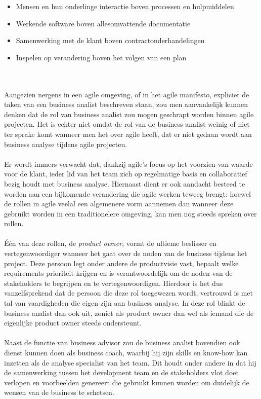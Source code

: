 \documentclass{hogent-article}
\begin{document}
\begin{itemize}
  \item Mensen en hun onderlinge interactie boven processen en hulpmiddelen
  \item Werkende software boven allesomvattende documentatie
  \item Samenwerking met de klant boven contractonderhandelingen
  \item Inspelen op verandering boven het volgen van een plan
\end{itemize}
\autocite{fowler2001agile}
\\~~\\
Aangezien nergens in een agile omgeving, of in het agile manifesto, expliciet de taken van een business analist beschreven staan, zou men aanvankelijk kunnen denken dat de rol van business analist zou mogen geschrapt worden binnen agile projecten. Het is echter niet omdat de rol van de business analist weinig of niet ter sprake komt wanneer men het over agile heeft, dat er niet gedaan wordt aan business analyse tijdens agile projecten. 
\\~~\\
Er wordt immers verwacht dat, dankzij agile's focus op het voorzien van waarde voor de klant, ieder lid van het team zich op regelmatige basis en collaboratief bezig houdt met business analyse. Hiernaast dient er ook aandacht besteed te worden aan een bijkomende verandering die agile werken teweeg brengt: hoewel de rollen in agile veelal een algemenere vorm aannemen dan wanneer deze gebruikt worden in een traditionelere omgeving, kan men nog steeds spreken over rollen. 
\\~~\\
Één van deze rollen, de \emph{product owner}, vormt de ultieme beslisser en vertegenwoordiger wanneer het gaat over de noden van de business tijdens het project. Deze persoon legt onder andere de productvisie vast, bepaalt welke requirements prioriteit krijgen en is verantwoordelijk om de noden van de stakeholders te begrijpen en te vertegenwoordigen. Hierdoor is het dus vanzelfsprekend dat de persoon die deze rol toegewezen wordt, vertrouwd is met tal van vaardigheden die eigen zijn aan business analyse. In deze rol blinkt de business analist dan ook uit, zoniet als product owner dan wel als iemand die de eigenlijke product owner steeds ondersteunt. 
\\~~\\
Naast de functie van business advisor zou de business analist bovendien ook dienst kunnen doen als business coach, waarbij hij zijn skills en know-how kan inzetten als de analyse specialist van het team. Dit houdt onder andere in dat hij de samenwerking tussen het development team en de stakeholders vlot doet verlopen en voorbeelden genereert die gebruikt kunnen worden om duidelijk de wensen van de business te schetsen.\autocite{mcdonald2017does}
\end{document}
